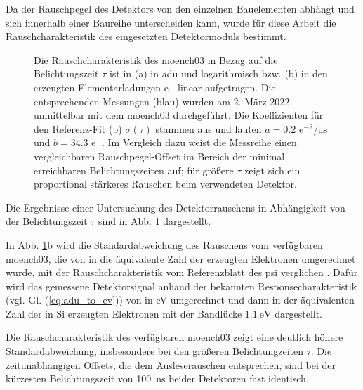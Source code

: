 \noindent
Da der Rauschpegel des Detektors von den einzelnen Bauelementen abhängt und sich innerhalb einer Baureihe unterscheiden kann, wurde für diese Arbeit die  Rauschcharakteristik des eingesetzten Detektormoduls bestimmt.
\begin{figure}[H]
    \centering
    
    \caption{Die Rauschcharakteristik des \gls{moench03} in Bezug auf die Belichtungszeit $\tau$ ist in (a) in \gls{adu} und logarithmisch bzw. (b) in den erzeugten Elementarladungen e$^-$ linear aufgetragen. Die entsprechenden Messungen (blau) wurden am 2. März 2022 unmittelbar mit dem \gls{moench03} durchgeführt. Die Koeffizienten für den Referenz-Fit (b) $\sigma(\tau)$ stammen aus \cite{ramilli-measurements-2017} und lauten $a=\num{0,2}$ e${^-}^2\si{\per\micro\second}$ und $b=\num{34.3}$ e${^-}$. Im Vergleich dazu weist die Messreihe einen vergleichbaren Rauschpegel-Offset im Bereich der minimal erreichbaren Belichtungszeiten auf; für größere $\tau$ zeigt sich ein proportional stärkeres Rauschen beim verwendeten Detektor.}
    \label{fig:noise_moench}
\end{figure}
\noindent
Die Ergebnisse einer Untersuchung des Detektorrauschens in Abhängigkeit von der Belichtungszeit $\tau$ sind in Abb. \ref{fig:noise_moench} dargestellt.

\noindent
In Abb. \ref{fig:noise_moench}b wird die Standardabweichung des Rauschens vom verfügbaren \gls{moench03}, die von \si{\adu} in die äquivalente Zahl der erzeugten Elektronen umgerechnet wurde, mit der Rauschcharakteristik vom Referenzblatt des \gls{psi} verglichen \cite{ramilli-measurements-2017}. Dafür wird das gemessene Detektorsignal anhand der bekannten Responsecharakteristik (vgl. Gl. (\ref{eq:adu_to_ev})) von \si{\adu} in \si{\eV} umgerechnet und dann in der äquivalenten Zahl der in Si erzeugten Elektronen mit der Bandlücke $\SI{1,1}{\eV}$ dargestellt.

\noindent
Die Rauschcharakteristik des verfügbaren \gls{moench03} zeigt eine deutlich höhere Standardabweichung, insbesondere bei den größeren Belichtungzeiten $\tau$. Die zeitunabhängigen Offsets, die dem Ausleserauschen entsprechen, sind bei der kürzesten Belichtungszeit von \SI{100}{\nano\second} beider Detektoren fast identisch.

